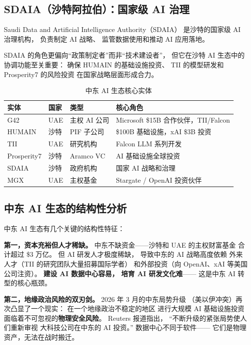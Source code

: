 \subsection{SDAIA（沙特阿拉伯）：国家级 AI 治理}

Saudi Data and Artificial Intelligence Authority（SDAIA）
是沙特的国家级 AI 治理机构，
负责制定 AI 战略、
监管数据使用和推动 AI 应用落地。

SDAIA 的角色更偏向``政策制定者''而非``技术建设者''，
但它在沙特 AI 生态中的协调功能至关重要：
确保 HUMAIN 的基础设施投资、
TII 的模型研发和 Prosperity7 的风险投资
在国家战略层面形成合力。

\begin{table}[htbp]
\centering
\caption{中东 AI 生态核心实体}
\label{tab:middle-east-ai}
\small
\begin{tabularx}{\textwidth}{l l l X}
\toprule
\rowcolor{figLightGray}
\textbf{实体} & \textbf{国家} & \textbf{类型} & \textbf{核心角色} \\
\midrule
G42           & UAE   & 主权 AI 公司 & Microsoft \$15B 合作伙伴，TII/Falcon \\
HUMAIN        & 沙特  & PIF 子公司   & \$100B 基础设施，xAI \$3B 投资 \\
TII           & UAE   & 研究机构     & Falcon LLM 系列开发 \\
Prosperity7   & 沙特  & Aramco VC   & AI 基础设施全球投资 \\
SDAIA         & 沙特  & 政府机构     & 国家 AI 战略和治理 \\
MGX           & UAE   & 主权基金     & Stargate / OpenAI 投资伙伴 \\
\bottomrule
\end{tabularx}
\end{table}

\subsection{中东 AI 生态的结构性分析}

中东 AI 生态有几个关键的结构性特征：

\textbf{第一，资本充裕但人才稀缺。}
中东不缺资金——沙特和 UAE 的主权财富基金
合计超过 \$3 万亿。
但 AI 研发人才极度稀缺，
导致中东的 AI 战略高度依赖
外来人才（TII 的研究团队大量招募国际学者）
和外部投资（向 OpenAI、xAI 等美国公司注资）。
\textbf{建设 AI 数据中心容易，
培育 AI 研发文化难}——
这是中东 AI 转型的核心瓶颈。

\textbf{第二，地缘政治风险的双刃剑。}
2026 年 3 月的中东局势升级
（美以伊冲突）再次凸显了一个现实：
在一个地缘政治不稳定的地区
进行大规模 AI 基础设施投资
面临着不可忽视的\textbf{物理安全风险}。
Reuters 报道指出，
``不断升级的紧张局势使人们重新审视
大科技公司在中东的 AI 投资。''
数据中心不同于软件——
它们是物理资产，无法在战时搬迁。

